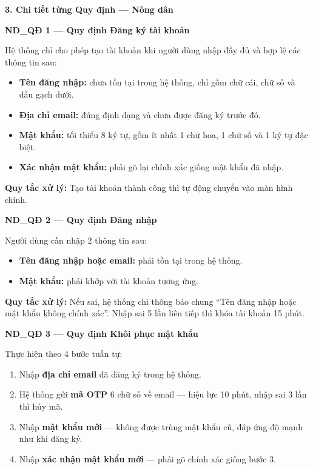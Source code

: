 \documentclass[12pt,a4paper]{article}
\begin{document}
\vspace{0.3cm}
\textbf{3. Chi tiết từng Quy định --- Nông dân}

\vspace{0.3cm}
\noindent\textbf{ND\_QĐ 1 --- Quy định Đăng ký tài khoản}

Hệ thống chỉ cho phép tạo tài khoản khi người dùng nhập đầy đủ và hợp lệ các thông tin sau:
\begin{itemize}
    \item \textbf{Tên đăng nhập:} chưa tồn tại trong hệ thống, chỉ gồm chữ cái, chữ số và dấu gạch dưới.
    \item \textbf{Địa chỉ email:} đúng định dạng và chưa được đăng ký trước đó.
    \item \textbf{Mật khẩu:} tối thiểu 8 ký tự, gồm ít nhất 1 chữ hoa, 1 chữ số và 1 ký tự đặc biệt.
    \item \textbf{Xác nhận mật khẩu:} phải gõ lại chính xác giống mật khẩu đã nhập.
\end{itemize}
\textbf{Quy tắc xử lý:} Tạo tài khoản thành công thì tự động chuyển vào màn hình chính.

\vspace{0.3cm}
\noindent\textbf{ND\_QĐ 2 --- Quy định Đăng nhập}

Người dùng cần nhập 2 thông tin sau:
\begin{itemize}
    \item \textbf{Tên đăng nhập hoặc email:} phải tồn tại trong hệ thống.
    \item \textbf{Mật khẩu:} phải khớp với tài khoản tương ứng.
\end{itemize}
\textbf{Quy tắc xử lý:} Nếu sai, hệ thống chỉ thông báo chung ``Tên đăng nhập hoặc mật khẩu không chính xác''. Nhập sai 5 lần liên tiếp thì khóa tài khoản 15 phút.

\vspace{0.3cm}
\noindent\textbf{ND\_QĐ 3 --- Quy định Khôi phục mật khẩu}

Thực hiện theo 4 bước tuần tự:
\begin{enumerate}
    \item Nhập \textbf{địa chỉ email} đã đăng ký trong hệ thống.
    \item Hệ thống gửi \textbf{mã OTP} 6 chữ số về email --- hiệu lực 10 phút, nhập sai 3 lần thì hủy mã.
    \item Nhập \textbf{mật khẩu mới} --- không được trùng mật khẩu cũ, đáp ứng độ mạnh như khi đăng ký.
    \item Nhập \textbf{xác nhận mật khẩu mới} --- phải gõ chính xác giống bước 3.
\end{enumerate}
\end{document}
